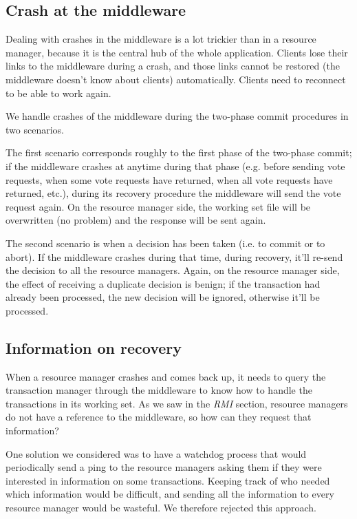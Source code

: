 \documentclass[11pt]{article}
\begin{document}
\subsection{Crash at the middleware}

Dealing with crashes in the middleware is a lot trickier than in a
resource manager, because it is the central hub of the whole
application.  Clients lose their links to the middleware during a
crash, and those links cannot be restored (the middleware doesn't know
about clients) automatically.  Clients need to reconnect to be able to
work again.

We handle crashes of the middleware during the two-phase commit
procedures in two scenarios.

The first scenario corresponds roughly to the first phase of the
two-phase commit; if the middleware crashes at anytime during that
phase (e.g. before sending vote requests, when some vote requests have
returned, when all vote requests have returned, etc.), during its
recovery procedure the middleware will send the vote request again.
On the resource manager side, the working set file will be overwritten
(no problem) and the response will be sent again.

The second scenario is when a decision has been taken (i.e. to commit
or to abort).  If the middleware crashes during that time, during
recovery, it'll re-send the decision to all the resource managers.
Again, on the resource manager side, the effect of receiving a
duplicate decision is benign; if the transaction had already been
processed, the new decision will be ignored, otherwise it'll be
processed.


\subsection{Information on recovery}

When a resource manager crashes and comes back up, it needs to query
the transaction manager through the middleware to know how to handle
the transactions in its working set.  As we saw in the {\it RMI}
section, resource managers do not have a reference to the middleware,
so how can they request that information?

One solution we considered was to have a watchdog process that would
periodically send a ping to the resource managers asking them if they
were interested in information on some transactions.  Keeping track of
who needed which information would be difficult, and sending all the
information to every resource manager would be wasteful.  We therefore
rejected this approach.
\end{document}
